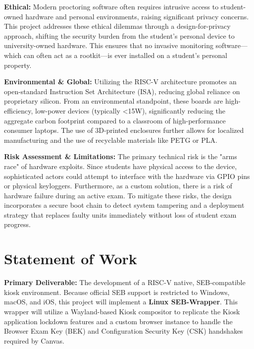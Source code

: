 \documentclass[11pt]{article}
\begin{document}
\clearpage

\textbf{Ethical:} 
Modern proctoring software often requires intrusive access to student-owned hardware and personal environments, raising significant privacy concerns. 
This project addresses these ethical dilemmas through a design-for-privacy approach, shifting the security burden from the student’s personal device to university-owned hardware. 
This ensures that no invasive monitoring software—which can often act as a rootkit—is ever installed on a student’s personal property.

\textbf{Environmental \& Global:} 
Utilizing the RISC-V architecture promotes an open-standard Instruction Set Architecture (ISA), reducing global reliance on proprietary silicon. 
From an environmental standpoint, these boards are high-efficiency, low-power devices (typically <15W), significantly reducing the aggregate carbon footprint compared to a classroom of high-performance consumer laptops. 
The use of 3D-printed enclosures further allows for localized manufacturing and the use of recyclable materials like PETG or PLA.



\textbf{Risk Assessment \& Limitations:} 
The primary technical risk is the "arms race" of hardware exploits. 
Since students have physical access to the device, sophisticated actors could attempt to interface with the hardware via GPIO pins or physical keyloggers. 
Furthermore, as a custom solution, there is a risk of hardware failure during an active exam. 
To mitigate these risks, the design incorporates a secure boot chain to detect system tampering and a deployment strategy that replaces faulty units immediately without loss of student exam progress.

\newpage
\section{Statement of Work}

\textbf{Primary Deliverable:} The development of a RISC-V native, SEB-compatible kiosk environment. Because official SEB support is restricted to Windows, macOS, and iOS, this project will implement a \textbf{Linux SEB-Wrapper}. This wrapper will utilize a Wayland-based Kiosk compositor to replicate the Kiosk application lockdown features and a custom browser instance to handle the Browser Exam Key (BEK) and Configuration Security Key (CSK) handshakes required by Canvas.
\end{document}
